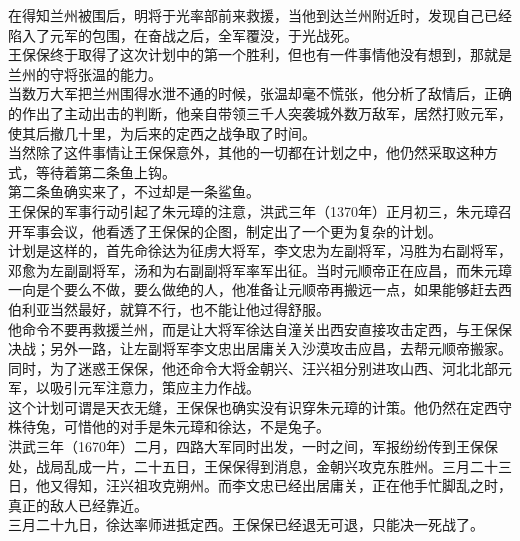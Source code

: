 \begin{multicols}{\theparacolNo}
在得知兰州被围后，明将于光率部前来救援，当他到达兰州附近时，发现自己已经陷入了元军的包围，在奋战之后，全军覆没，于光战死。\\

王保保终于取得了这次计划中的第一个胜利，但也有一件事情他没有想到，那就是兰州的守将张温的能力。\\

当数万大军把兰州围得水泄不通的时候，张温却毫不慌张，他分析了敌情后，正确的作出了主动出击的判断，他亲自带领三千人突袭城外数万敌军，居然打败元军，使其后撤几十里，为后来的定西之战争取了时间。\\

当然除了这件事情让王保保意外，其他的一切都在计划之中，他仍然采取这种方式，等待着第二条鱼上钩。\\

第二条鱼确实来了，不过却是一条鲨鱼。\\

王保保的军事行动引起了朱元璋的注意，洪武三年（1370年）正月初三，朱元璋召开军事会议，他看透了王保保的企图，制定出了一个更为复杂的计划。\\

计划是这样的，首先命徐达为征虏大将军，李文忠为左副将军，冯胜为右副将军，邓愈为左副副将军，汤和为右副副将军率军出征。当时元顺帝正在应昌，而朱元璋一向是个要么不做，要么做绝的人，他准备让元顺帝再搬远一点，如果能够赶去西伯利亚当然最好，就算不行，也不能让他过得舒服。\\

他命令不要再救援兰州，而是让大将军徐达自潼关出西安直接攻击定西，与王保保决战；另外一路，让左副将军李文忠出居庸关入沙漠攻击应昌，去帮元顺帝搬家。\\

同时，为了迷惑王保保，他还命令大将金朝兴、汪兴祖分别进攻山西、河北北部元军，以吸引元军注意力，策应主力作战。\\

这个计划可谓是天衣无缝，王保保也确实没有识穿朱元璋的计策。他仍然在定西守株待兔，可惜他的对手是朱元璋和徐达，不是兔子。\\

洪武三年（1670年）二月，四路大军同时出发，一时之间，军报纷纷传到王保保处，战局乱成一片，二十五日，王保保得到消息，金朝兴攻克东胜州。三月二十三日，他又得知，汪兴祖攻克朔州。而李文忠已经出居庸关，正在他手忙脚乱之时，真正的敌人已经靠近。\\

三月二十九日，徐达率师进抵定西。王保保已经退无可退，只能决一死战了。\\


\end{multicols}
